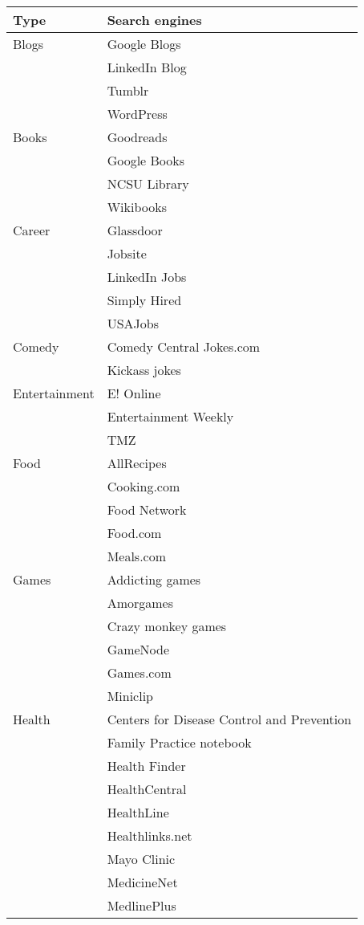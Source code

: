 \begin{center}
\begin{table}
  \begin{tabular}{ | l | l | }
    \hline
    \textbf{Type} & \textbf{Search engines} \\ \hline
Blogs
& 	Google Blogs	\\
& 	LinkedIn Blog	\\
& 	Tumblr	\\
& 	WordPress	\\
\hline
Books
& 	Goodreads	\\
& 	Google Books	\\
& 	NCSU Library 	\\
&	Wikibooks	\\
\hline
Career
& 	Glassdoor	\\
& 	Jobsite	\\
& 	LinkedIn Jobs	\\
& 	Simply Hired	\\
& 	USAJobs	\\
\hline
Comedy
& 	Comedy Central Jokes.com	\\
& 	Kickass jokes	\\
\hline
Entertainment
& 	E! Online	\\
& 	Entertainment Weekly	\\
& 	TMZ	\\
\hline
Food
& 	AllRecipes	\\
& 	Cooking.com	\\
& 	Food Network	\\
& 	Food.com	\\
& 	Meals.com	\\
\hline
Games
& 	Addicting games	\\
& 	Amorgames	\\
& 	Crazy monkey games	\\
& 	GameNode	\\
& 	Games.com	\\
& 	Miniclip	\\
\hline
Health
& 	Centers for Disease Control and Prevention	\\
& 	Family Practice notebook	\\
& 	Health Finder	\\
& 	HealthCentral	\\
& 	HealthLine	\\
& 	Healthlinks.net	\\
& 	Mayo Clinic	\\
& 	MedicineNet	\\
& 	MedlinePlus	\\

\end{tabular}
\end{table}
\end{center}
